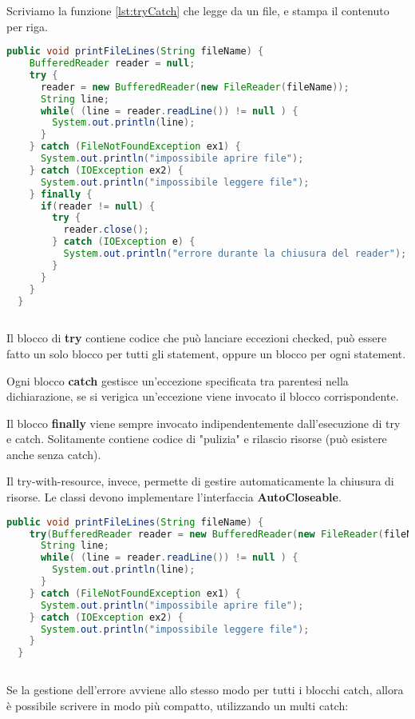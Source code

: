 \documentclass[a4paper,12pt,twoside]{book}
\begin{document}
Scriviamo la funzione \ref{lst:tryCatch} che legge da un file, e
stampa il contenuto per riga.

\begin{lstlisting}[caption={}, label={lst:tryCatch}, language=Java]
  public void printFileLines(String fileName) {
    BufferedReader reader = null;
    try {
      reader = new BufferedReader(new FileReader(fileName));
      String line;
      while( (line = reader.readLine()) != null ) {
        System.out.println(line);
      }
    } catch (FileNotFoundException ex1) {
      System.out.println("impossibile aprire file");
    } catch (IOException ex2) {
      System.out.println("impossibile leggere file");
    } finally {
      if(reader != null) {
        try {
          reader.close();
        } catch (IOException e) {
          System.out.println("errore durante la chiusura del reader");
        }
      }
    }
  }
  
\end{lstlisting}

Il blocco di \textbf{try} contiene codice che può lanciare eccezioni
checked, può essere fatto un solo blocco per tutti gli statement,
oppure un blocco per ogni statement.

Ogni blocco \textbf{catch} gestisce un'eccezione specificata tra
parentesi nella dichiarazione, se si verigica un'eccezione viene
invocato il blocco corrispondente.

Il blocco \textbf{finally} viene sempre invocato indipendentemente
dall'esecuzione di try e catch. Solitamente contiene codice di
"pulizia" e rilascio risorse (può esistere anche senza catch).

Il try-with-resource, invece, permette di gestire automaticamente la
chiusura di risorse. Le classi devono implementare l’interfaccia
\textbf{AutoCloseable}.

\begin{lstlisting}[caption={}, label={lst:tryRes}, language=Java]
  public void printFileLines(String fileName) {
    try(BufferedReader reader = new BufferedReader(new FileReader(fileName))){
      String line;
      while( (line = reader.readLine()) != null ) {
        System.out.println(line);
      }
    } catch (FileNotFoundException ex1) {
      System.out.println("impossibile aprire file");
    } catch (IOException ex2) {
      System.out.println("impossibile leggere file");
    }
  }
  
\end{lstlisting}

Se la gestione dell’errore avviene allo stesso modo per tutti i
blocchi catch, allora è possibile scrivere in modo più compatto,
utilizzando un multi catch:
\end{document}

